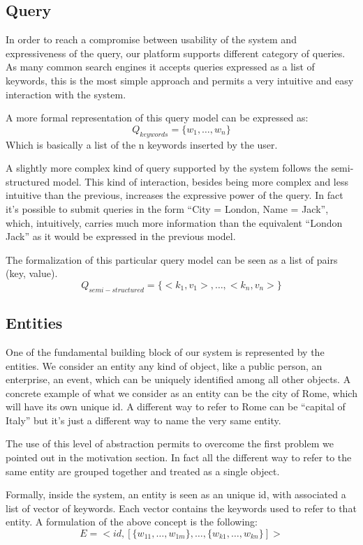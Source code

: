 \documentclass{acm_proc_article-sp-sigmod07}
\begin{document}
\subsection{Query}
In order to reach a compromise between usability of the system and
expressiveness of the query, our platform supports different category of
queries. As many common search engines it accepts queries expressed
as a list of keywords, this is the most simple approach and permits a very
intuitive and easy interaction with the system.

A more formal representation of this query model can be expressed as:
$$
Q_{keywords} = \{w_1,\dots,w_n\}
$$
Which is basically a list of the n keywords inserted by the user.

A slightly more complex kind of query supported by the system follows the
semi-structured model. This kind of interaction, besides being more
complex and less intuitive than the previous, increases the expressive
power of the query.
In fact it's possible to submit queries in the form ``City = London, Name
= Jack'', which, intuitively, carries much more information than the
equivalent ``London Jack'' as it would be expressed in the previous model.

The formalization of this particular query model can be seen as a list of
pairs (key, value).
$$
Q_{semi-structured} = \{<k_1, v_1>, \dots, <k_n, v_n>\}
$$

\subsection{Entities}
One of the fundamental building block of our system is represented by the
entities. We consider an entity any kind of object, like a public person,
an enterprise, an event, which can be uniquely identified among all other
objects.
A concrete example of what we consider as an entity can be the city of
Rome, which will have its own unique id. A different way to refer to Rome
can be ``capital of Italy'' but it's just a different way to name the very
same entity.

The use of this level of abstraction permits to overcome the first problem
we pointed out in the motivation section. In fact all the different way to
refer to the same entity are grouped together and treated as a single
object.

Formally, inside the system, an entity is seen as an unique id, with
associated a list of vector of keywords. Each vector contains the keywords
used to refer to that entity.
A formulation of the above concept is the following:
$$
E = <id, [\{w_{11}, \dots, w_{1m}\},\dots, \{w_{k1}, \dots, w_{kn}\}]>
$$
\end{document}
